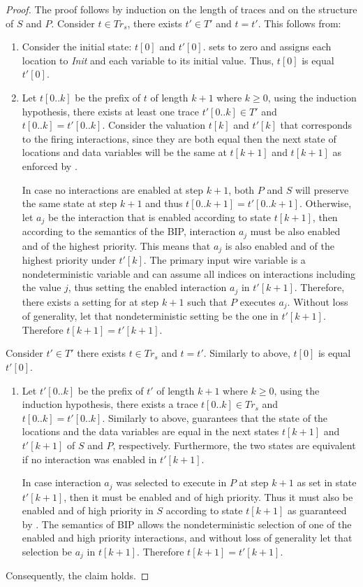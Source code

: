 \begin{proof}
The proof follows by induction on the length of traces and on the structure of $S$ and $P$.
%
Consider $t \in Tr_s$, there exists $t' \in T'$ and $t = t'$. This follows from: 
\begin{enumerate}
\item Consider the initial state: $t[0]$ and $t'[0]$.  sets  to zero and assigns each location to \textit{Init} and each variable to its initial value. Thus, $t[0]$ is equal $t'[0]$. 
\item Let $t[0..k]$ be the prefix of $t$ of length $k+1$ where $k\ge 0$, using the induction hypothesis, there exists at least one trace 
  $t'[0..k] \in T'$ and $t[0..k]=t'[0..k]$. 
  Consider the valuation $t[k]$ and $t'[k]$ that corresponds to the firing interactions, since they are both equal then the next state of locations
  and data variables will be the same at $t[k+1]$ and $t[k+1]$ as enforced by . 

  In case no interactions are enabled at step $k+1$, both $P$ and $S$ will preserve the same state at step $k+1$ and thus $t[0..k+1] =t'[0..k+1]$. 
  Otherwise, let $a_j$ be the interaction that is enabled according to state $t[k+1]$, 
  then according to the semantics of the BIP, interaction $a_j$ must be also enabled and of the highest priority. 
  This means that $a_j$ is also enabled and of the highest priority under $t'[k]$. 
  The primary input  wire variable is a nondeterministic variable and can assume all indices on interactions including the value 
  $j$, thus setting the enabled interaction $a_j$ in $t'[k+1]$. 
  Therefore, there exists a setting for  at step $k+1$ such that $P$ executes $a_j$. 
  Without loss of generality, let that nondeterministic setting be the one in $t'[k+1]$. 
  Therefore $t[k+1] = t'[k+1]$. 
\end{enumerate}
Consider $t' \in T'$ there exists $t \in Tr_s$ and $t = t'$. Similarly to above, $t[0]$ is equal $t'[0]$.
\begin{enumerate}
\item Let $t'[0..k]$ be the prefix of $t'$ of length $k+1$ where $k\ge 0$, using the induction hypothesis, there exists a trace 
  $t[0..k] \in Tr_s$ and $t[0..k]=t'[0..k]$. 
  Similarly to above,  guarantees that the state of the locations and the data variables are equal in the next states $t[k+1]$ and $t'[k+1]$ of $S$ and $P$, respectively. Furthermore, the two states are equivalent if no interaction was enabled in $t'[k+1]$. 

In case interaction $a_j$ was selected to execute in $P$ at step $k+1$ as set in state $t'[k+1]$, 
then it must be enabled and of high priority.
Thus it must also be enabled and of high priority in $S$ according to state $t[k+1]$
as guaranteed by . 
The semantics of BIP allows the nondeterministic selection of
one of the enabled and high priority interactions, and without loss of generality let that selection be $a_j$ in $t[k+1]$. 
Therefore $t[k+1]=t'[k+1]$. 
\end{enumerate}
Consequently, the claim holds. 
\end{proof}
